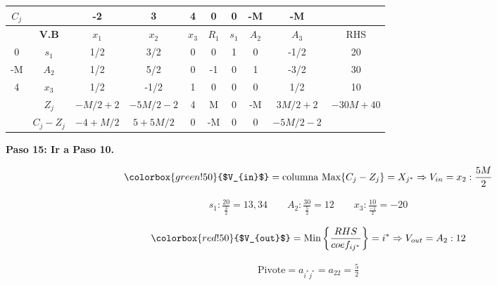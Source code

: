 \documentclass{templateNote}
\begin{document}
\begin{center}
    \begin{tabular}{|c|c|c|c|c|c|c|c|c|c|}
        \hline
        $C_j$ & & -2 & 3 & 4 & 0 & 0 & -M & -M & \\ \hline
        & \textbf{V.B} & $x_1$ & $x_2$ & $x_3$ & $R_1$ & $s_1$ & $A_2$ & $A_3$ & RHS \\ \hline
        0 & $s_1$ & 1/2 & 3/2 & 0 & 0 & 1 & 0 & -1/2 & 20 \\ \hline
        -M & $A_2$ & 1/2 & 5/2 & 0 & -1 & 0 & 1 & -3/2 & 30 \\ \hline
        4 & $x_3$ & 1/2 & -1/2 & 1 & 0 & 0 & 0 & 1/2 & 10 \\ \hline
        & $Z_j$ & $-M/2 + 2$ & $-5M/2 - 2$ & 4 & M & 0 & -M & $3M/2 + 2$ & \underline{$-30M + 40$} \\ \hline
        & $C_j - Z_j$ & $-4 +M/2$ & $5+5M/2$ & 0 & -M & 0 & 0 & $-5M/2 -2$ & \\ \hline
    \end{tabular}
\end{center}
\newpage
\textbf{Paso 15: Ir a Paso 10.}
\begin{center}
    \begin{equation*}
        \colorbox{green!50}{$V_{in}$} = \text{columna Max} \{C_j-Z_j\} = X_{j^*} \Rightarrow V_{in} = x_2 : \frac{5M}{2} 
    \end{equation*}
\end{center}
\begin{align*}
    s_1: \frac{20}{\frac{3}{2}} = 13,34 \qquad A_2: \frac{30}{\frac{5}{2}} = 12 \qquad x_3: \frac{10}{\frac{-1}{2}} = -20
\end{align*}
\begin{center}
    \begin{equation*}
        \colorbox{red!50}{$V_{out}$} = \text{Min} \left\{ \frac{RHS}{coef_{ij^*}} \right\} = i^* \Rightarrow V_{out} = A_2 : 12
    \end{equation*}
\end{center}
\begin{equation*}
    \begin{aligned}
        \text{Pivote} = a_{i^*j^*} = a_{22} = \frac{5}{2}
    \end{aligned}
\end{equation*}
\end{document}
